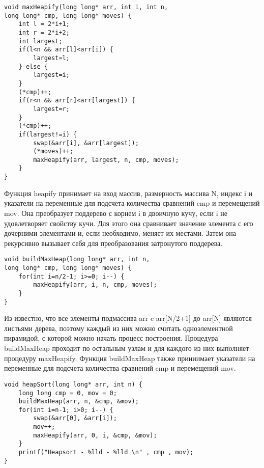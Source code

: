 \documentclass[a4paper,12pt,titlepage,finall]{article}
\begin{document}
\lstset{language=c}
\begin{lstlisting} 
void maxHeapify(long long* arr, int i, int n, 
long long* cmp, long long* moves) {
    int l = 2*i+1;
    int r = 2*i+2;
    int largest;
    if(l<n && arr[l]<arr[i]) {
        largest=l;
    } else {
        largest=i;
    }
    (*cmp)++;
    if(r<n && arr[r]<arr[largest]) {
        largest=r;
    }
    (*cmp)++;
    if(largest!=i) {
        swap(&arr[i], &arr[largest]);
        (*moves)++;
        maxHeapify(arr, largest, n, cmp, moves);
    }
}
\end{lstlisting}\par

Функция heapify принимает на вход массив, размерность массива N, индекс i и указатели на переменные для подсчета количества сравнений cmp и перемещений mov. Она преобразует поддерево с корнем i в двоичную кучу, если i не удовлетворяет свойству кучи. Для этого она сравнивает значение элемента с его дочерними элементами и, если необходимо, меняет их местами. Затем она рекурсивно вызывает себя для преобразования затронутого поддерева.\par

\lstset{language=c}
\begin{lstlisting} 
void buildMaxHeap(long long* arr, int n, 
long long* cmp, long long* moves) {
    for(int i=n/2-1; i>=0; i--) {
        maxHeapify(arr, i, n, cmp, moves);
    }
}
\end{lstlisting}\par

Из \cite{cormen} известно, что все элементы подмассива arr c arr[N/2+1] до arr[N] являются листьями дерева, поэтому каждый из них можно считать одноэлементной пирамидой, с которой можно начать процесс построения. Процедура buildMaxHeap проходит по остальным узлам и для каждого из них выполняет процедуру maxHeapify. Функция buildMaxHeap также приниимает указатели на переменные для подсчета количества сравнений cmp и перемещений mov.\par

\lstset{language=c}
\begin{lstlisting} 
void heapSort(long long* arr, int n) {
    long long cmp = 0, mov = 0;
    buildMaxHeap(arr, n, &cmp, &mov);
    for(int i=n-1; i>0; i--) {
        swap(&arr[0], &arr[i]);
        mov++;
        maxHeapify(arr, 0, i, &cmp, &mov);
    }
    printf("Heapsort - %lld - %lld \n" , cmp , mov);
}
\end{lstlisting}\par
\end{document}
